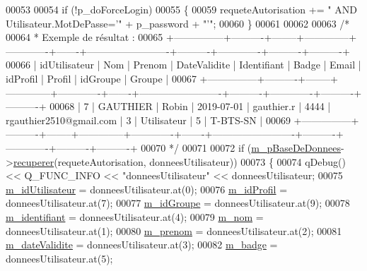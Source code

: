 \begin{DoxyCode}
00053 
00054     \textcolor{keywordflow}{if} (!p\_doForceLogin)
00055     \{
00059         requeteAutorisation += \textcolor{stringliteral}{" AND Utilisateur.MotDePasse='"} + p\_password + \textcolor{stringliteral}{"'"};
00060     \}
00061 
00062 
00063     \textcolor{comment}{/*}
00064 \textcolor{comment}{     * Exemple de résultat :}
00065 \textcolor{comment}{
      +---------------+----------+--------+--------------+-------------+-------+-------------------------+----------+-------------+----------+----------+}
00066 \textcolor{comment}{| idUtilisateur | Nom      | Prenom | DateValidite | Identifiant | Badge | Email                   |
       idProfil | Profil      | idGroupe | Groupe   |}
00067 \textcolor{comment}{
      +---------------+----------+--------+--------------+-------------+-------+-------------------------+----------+-------------+----------+----------+}
00068 \textcolor{comment}{|             7 | GAUTHIER | Robin  | 2019-07-01   | gauthier.r  | 4444  | rgauthier2510@gmail.com |       
       3 | Utilisateur |        5 | T-BTS-SN |}
00069 \textcolor{comment}{
      +---------------+----------+--------+--------------+-------------+-------+-------------------------+----------+-------------+----------+----------+}
00070 \textcolor{comment}{     */}
00071 
00072     \textcolor{keywordflow}{if} (\hyperlink{class_utilisateur_terminal_a93aefda4243fed6c1b74d78fa5fc954d}{m\_pBaseDeDonnees}->\hyperlink{class_base_de_donnees_a77539baad389f5acf754cd2cd452403e}{recuperer}(requeteAutorisation, donneesUtilisateur))
00073     \{
00074         qDebug() << Q\_FUNC\_INFO << \textcolor{stringliteral}{"donneesUtilisateur"} << donneesUtilisateur;
00075         \hyperlink{class_utilisateur_terminal_a3a8aeb429529ae1600c799e427370f78}{m\_idUtilisateur} = donneesUtilisateur.at(0);
00076         \hyperlink{class_utilisateur_terminal_af3d06352ecbd2d4439626b4ba53b55be}{m\_idProfil} = donneesUtilisateur.at(7);
00077         \hyperlink{class_utilisateur_terminal_a669ece5480e25b47711c430d020581c2}{m\_idGroupe} = donneesUtilisateur.at(9);
00078         \hyperlink{class_utilisateur_terminal_a4dd1abd0c87ed9bf99ab3343e17cef43}{m\_identifiant} = donneesUtilisateur.at(4);
00079         \hyperlink{class_utilisateur_terminal_a4b48835dcadacd5e7d5c9662b70cdc7d}{m\_nom} = donneesUtilisateur.at(1);
00080         \hyperlink{class_utilisateur_terminal_a6dc3be09e844fc14aafec8019a1e2a5e}{m\_prenom} = donneesUtilisateur.at(2);
00081         \hyperlink{class_utilisateur_terminal_a7af3e6861711071624b93544adf3ca48}{m\_dateValidite} = donneesUtilisateur.at(3);
00082         \hyperlink{class_utilisateur_terminal_a06e0603919eb3846cf5bd232c105d1a7}{m\_badge} = donneesUtilisateur.at(5);

\end{DoxyCode}
